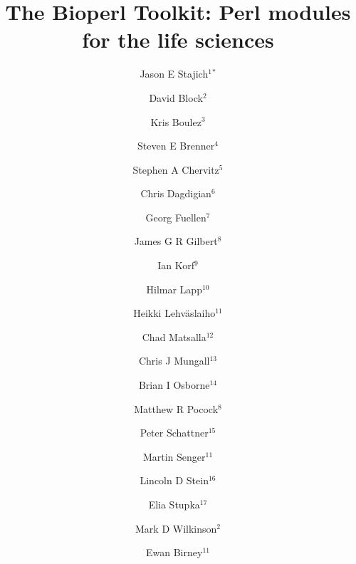 \documentclass[12pt]{article}
\begin{document}
\doublespacing

\title{The Bioperl Toolkit: Perl modules for the life sciences}


\author{Jason E Stajich$^{1}$$^*$ 
\and David Block$^{2}$ 
\and Kris Boulez$^{3}$
\and Steven E Brenner$^{4}$ 
\and Stephen A Chervitz$^{5}$ 
\and Chris Dagdigian$^{6}$ 
\and Georg Fuellen$^{7}$ 
\and James G R Gilbert$^{8}$
\and Ian Korf$^{9}$ 
\and Hilmar Lapp$^{10}$ 
\and Heikki Lehv\"{a}slaiho$^{11}$ 
\and Chad Matsalla$^{12}$ 
\and Chris J Mungall$^{13}$ 
\and Brian I Osborne$^{14}$ 
\and Matthew R Pocock$^8$ 
\and Peter Schattner$^{15}$ 
\and Martin Senger$^{11}$ 
\and Lincoln D Stein$^{16}$ 
\and Elia Stupka$^{17}$ 
\and Mark D Wilkinson$^2$ 
\and Ewan Birney$^{11}$ \\}

\maketitle
\end{document}

